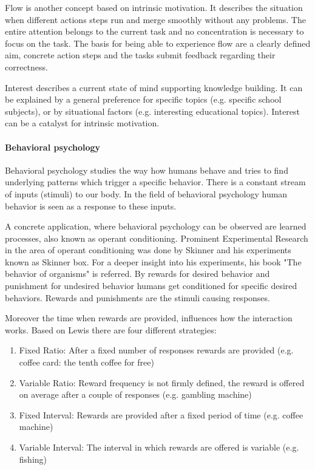 Flow is another concept based on intrinsic motivation. It describes the situation when different actions steps run and merge smoothly without any problems. The entire attention belongs to the current task and no concentration is necessary to focus on the task. The basis for being able to experience flow are a clearly defined aim, concrete action steps and the tasks submit feedback regarding their correctness. \cite[p. 19, 20, 21]{bierhoffeditorEnzyklopaediePsychologieSoziale2016}

Interest describes a current state of mind supporting knowledge building. It can be explained by a general preference for specific topics (e.g. specific school subjects), or by situational factors (e.g. interesting educational topics). Interest can be a catalyst for intrinsic motivation. \cite[p. 22, 23, 24]{bierhoffeditorEnzyklopaediePsychologieSoziale2016}

\paragraph*{Behavioral psychology}

Behavioral psychology studies the way how humans behave and tries to find underlying patterns which trigger a specific behavior. There is a constant stream of inputs (stimuli) to our body. In the field of  behavioral psychology human behavior is seen as a response to these inputs. \cite[p. 10]{lewisIrresistibleAppsMotivational2014}

A concrete application, where behavioral psychology can be observed are learned processes, also known as operant conditioning. Prominent Experimental Research in the area of operant conditioning was done by Skinner and his experiments known as Skinner box. For a deeper insight into his experiments, his book "The behavior of organisms" \cite{skinnerBehaviorOrganisms1938} is referred. By rewards for desired behavior and punishment for undesired behavior humans get conditioned for specific desired behaviors. Rewards and punishments are the stimuli causing responses. \cite[p. 11]{lewisIrresistibleAppsMotivational2014}

Moreover the time when rewards are provided, influences how the interaction works.
Based on Lewis \cite[p. 10]{lewisIrresistibleAppsMotivational2014} there are four different strategies:
\begin{enumerate}
	\item Fixed Ratio: After a fixed number of responses rewards are provided (e.g. coffee card: the tenth coffee for free)
	\item Variable Ratio: Reward frequency is not firmly defined, the reward is offered on average after a couple of responses (e.g. gambling machine)
	\item Fixed Interval: Rewards are provided after a fixed period of time (e.g. coffee machine)
	\item Variable Interval: The interval in which rewards are offered is variable (e.g. fishing)
\end{enumerate}

